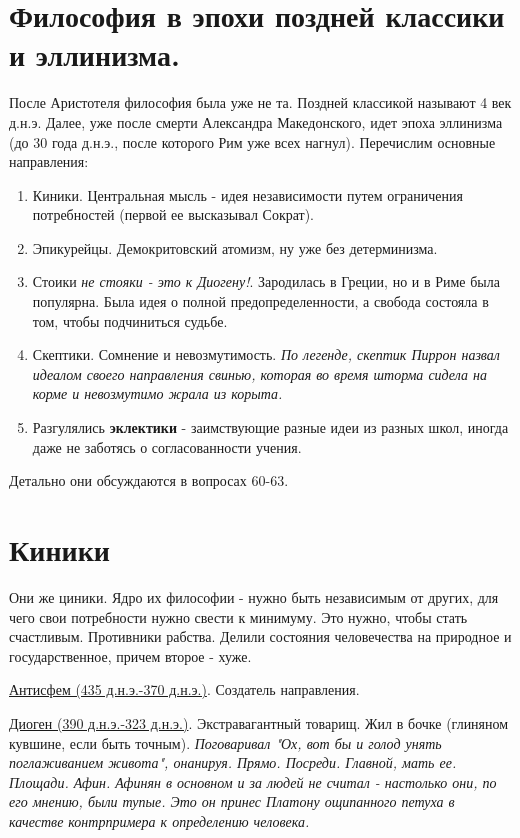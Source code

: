 \section{Философия в эпохи поздней классики и эллинизма.}
После Аристотеля философия была уже не та. Поздней классикой называют 4 век д.н.э. Далее, уже после смерти Александра Македонского, идет эпоха эллинизма (до 30 года д.н.э., после которого Рим уже всех нагнул). Перечислим основные направления:
\begin{enumerate}
\item Киники. Центральная мысль - идея независимости путем ограничения потребностей (первой ее высказывал Сократ).
\item Эпикурейцы. Демокритовский атомизм, ну уже без детерминизма.
\item Стоики \textit{не стояки - это к Диогену!}. Зародилась в Греции, но и в Риме была популярна. Была идея о полной предопределенности, а свобода состояла в том, чтобы подчиниться судьбе.
\item Скептики. Сомнение и невозмутимость. \textit{По легенде, скептик Пиррон назвал идеалом своего направления свинью, которая во время шторма сидела на корме и невозмутимо жрала из корыта.}
\item Разгулялись \textbf{эклектики}  - заимствующие разные идеи из разных школ, иногда даже не заботясь о согласованности учения.
\end{enumerate}
Детально они обсуждаются в вопросах 60-63.


\section{Киники}

Они же циники. Ядро их философии - нужно быть независимым от других, для чего свои потребности нужно свести к минимуму. Это нужно, чтобы стать счастливым.
Противники рабства. Делили состояния человечества на природное и государственное, причем второе - хуже.

\underline{Антисфем (435 д.н.э.-370 д.н.э.)}. Создатель направления.

\underline{Диоген (390 д.н.э.-323 д.н.э.)}. Экстравагантный товарищ. Жил в бочке (глиняном кувшине, если быть точным). \textit{Поговаривал "Ох, вот бы и голод унять поглаживанием живота", онанируя. Прямо. Посреди. Главной, мать ее. Площади. Афин. Афинян в основном и за людей не считал - настолько они, по его мнению, были тупые. Это он принес Платону ощипанного петуха в качестве контрпримера к определению человека.}

